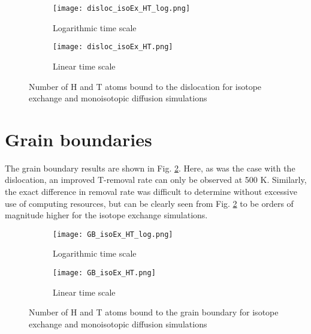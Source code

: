 \begin{figure}[!ht]
\begin{subfigure}{.5\textwidth}
  \centering
 \texttt{[image: disloc\_isoEx\_HT\_log.png]}  
  \caption{Logarithmic time scale}
\end{subfigure}
\begin{subfigure}{.5\textwidth}
  \centering
  \texttt{[image: disloc\_isoEx\_HT.png]}  
  \caption{Linear time scale}
\end{subfigure}
   \caption{Number of H and T atoms bound to the dislocation for isotope exchange and monoisotopic diffusion simulations}
   \label{Fig:disloc_results} 
\end{figure}



\section{Grain boundaries}
The grain boundary results are shown in Fig. \ref{Fig:GB_results}. 
Here, as was the case with the dislocation, an improved T-removal rate can only be observed at 500 K.
Similarly, the exact difference in removal rate was difficult to determine without excessive use of computing resources, but can be clearly seen from Fig. \ref{Fig:GB_results} to be orders of magnitude higher for the isotope exchange simulations.


\begin{figure}[!ht]
\begin{subfigure}{.5\textwidth}
  \centering
 \texttt{[image: GB\_isoEx\_HT\_log.png]}  
  \caption{Logarithmic time scale}
\end{subfigure}
\begin{subfigure}{.5\textwidth}
  \centering
  \texttt{[image: GB\_isoEx\_HT.png]}  
  \caption{Linear time scale}
\end{subfigure}
   \caption{Number of H and T atoms bound to the grain boundary for isotope exchange and monoisotopic diffusion simulations}
   \label{Fig:GB_results} 
\end{figure}

